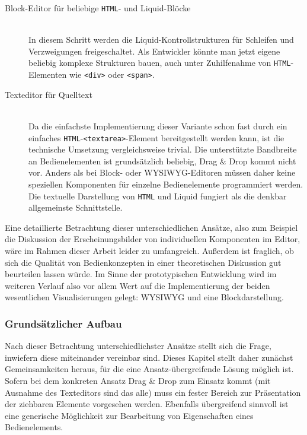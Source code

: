 \begin{description}
\item[ Block-Editor für beliebige \texttt{HTML}- und Liquid-Blöcke] \hfill \\
  In diesem Schritt werden die Liquid-Kontrollstrukturen für Schleifen und Verzweigungen freigeschaltet. Als Entwickler könnte man jetzt eigene beliebig komplexe Strukturen bauen, auch unter Zuhilfenahme von \texttt{HTML}-Elementen wie \texttt{<div>} oder \texttt{<span>}.
  
\item[ Texteditor für Quelltext] \hfill \\
  Da die einfachste Implementierung dieser Variante schon fast durch ein einfaches \texttt{HTML}-\texttt{<textarea>}-Element bereitgestellt werden kann, ist die technische Umsetzung vergleichsweise trivial. Die unterstützte Bandbreite an Bedienelementen ist grundsätzlich beliebig, Drag \& Drop kommt nicht vor. Anders als bei Block- oder WYSIWYG-Editoren müssen daher keine speziellen Komponenten für einzelne Bedienelemente programmiert werden. Die textuelle Darstellung von \texttt{HTML} und Liquid fungiert als die denkbar allgemeinste Schnittstelle.  
\end{description}

Eine detaillierte Betrachtung dieser unterschiedlichen Ansätze, also zum Beispiel die Diskussion der Erscheinungsbilder von individuellen Komponenten im Editor, wäre im Rahmen dieser Arbeit leider zu umfangreich. Außerdem ist fraglich, ob sich die Qualität von Bedienkonzepten in einer theoretischen Diskussion gut beurteilen lassen würde. Im Sinne der prototypischen Entwicklung wird im weiteren Verlauf also vor allem Wert auf die Implementierung der beiden wesentlichen Visualisierungen gelegt: WYSIWYG und eine Blockdarstellung.

\subsubsection{Grundsätzlicher Aufbau}
\label{sec:design-ui-editor}

Nach dieser Betrachtung unterschiedlichster Ansätze stellt sich die Frage, inwiefern diese miteinander vereinbar sind. Dieses Kapitel stellt daher zunächst Gemeinsamkeiten heraus, für die eine Ansatz-übergreifende Lösung möglich ist. Sofern bei dem konkreten Ansatz Drag \& Drop zum Einsatz kommt (mit Ausnahme des Texteditors sind das alle) muss ein fester Bereich zur Präsentation der ziehbaren Elemente vorgesehen werden. Ebenfalls übergreifend sinnvoll ist eine generische Möglichkeit zur Bearbeitung von Eigenschaften eines Bedienelements.

